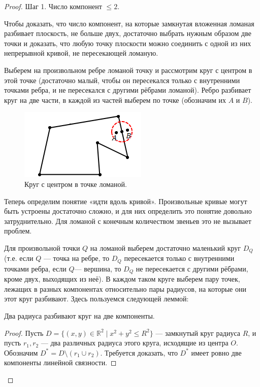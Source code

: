 \begin{proof}
    Шаг 1. Число компонент $\leq 2$.

    Чтобы доказать, что число компонент, на которые замкнутая вложенная ломаная разбивает плоскость, не больше двух, достаточно выбрать нужным образом две точки и доказать, что любую точку плоскости можно соединить с одной из них непрерывной кривой, не пересекающей ломаную.

    Выберем на произвольном ребре ломаной точку и рассмотрим круг с центром в этой точке (достаточно малый, чтобы он пересекался только с внутренними точками ребра, и не пересекался с другими рёбрами ломаной). Ребро разбивает круг на две части, в каждой из частей выберем по точке (обозначим их $A$ и $B$).

    \begin{figure}[h]
        \centering
        \includegraphics{images/c4.1.png}
        \caption{Круг с центром в точке ломаной.}
        \label{fig:c4.1}
    \end{figure}

    Теперь определим понятие «идти вдоль кривой». Произвольные кривые могут быть устроены достаточно сложно, и для них определить это понятие довольно затруднительно. Для ломаной с конечным количеством звеньев это не вызывает проблем.

    Для произвольной точки $Q$ на ломаной выберем достаточно маленький круг $D_Q$ (т.е. если $Q$ — точка на ребре, то $D_Q$ пересекается только с внутренними точками ребра, если $Q$— вершина, то $D_Q$ не пересекается с другими рёбрами, кроме двух, выходящих из неё). В каждом таком круге выберем пару точек, лежащих в разных компонентах относительно пары радиусов, на которые они этот круг разбивают. Здесь пользуемся следующей леммой:

    \begin{lemma}
        Два радиуса разбивают круг на две компоненты.
    \end{lemma}
    \begin{proof}
        Пусть $D = \{ (x,y) \in \mathbb{R}^2 \mid x^2 + y^2 \leq R^2 \}$ — замкнутый круг радиуса $R$, и пусть $r_1, r_2$ — два различных радиуса этого круга, исходящие из центра $O$. Обозначим $D^* = D \setminus (r_1 \cup r_2)$. Требуется доказать, что $D^*$ имеет ровно две компоненты линейной связности.


\end{proof}
\end{proof}
